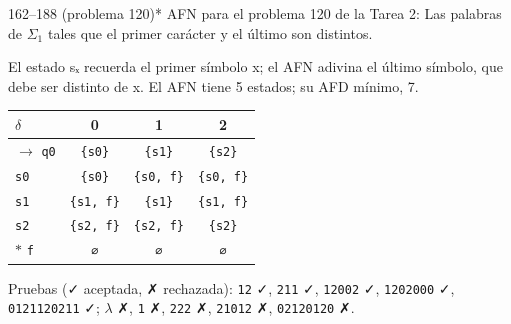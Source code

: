 \documentclass[11pt]{article}
\begin{document}
\begin{ejercicio}{162--188 (problema 120)}{*}
AFN para el problema 120 de la Tarea 2: Las palabras de $\Sigma_1$ tales que el primer carácter y el último son distintos.
\end{ejercicio}
\proc El estado sₓ recuerda el primer símbolo x; el AFN adivina el último símbolo, que debe ser distinto de x. El AFN tiene 5 estados; su AFD mínimo, 7.
\begin{center}\small\begin{tabular}{lccc}\toprule
$\delta$ & 0 & 1 & 2 \\\midrule
$\to$ \texttt{q0} & \texttt{\{s0\}} & \texttt{\{s1\}} & \texttt{\{s2\}} \\
 \texttt{s0} & \texttt{\{s0\}} & \texttt{\{s0, f\}} & \texttt{\{s0, f\}} \\
 \texttt{s1} & \texttt{\{s1, f\}} & \texttt{\{s1\}} & \texttt{\{s1, f\}} \\
 \texttt{s2} & \texttt{\{s2, f\}} & \texttt{\{s2, f\}} & \texttt{\{s2\}} \\
$*$ \texttt{f} & \texttt{∅} & \texttt{∅} & \texttt{∅} \\
\bottomrule\end{tabular}\end{center}
Pruebas (✓ aceptada, ✗ rechazada): \texttt{12} ✓, \texttt{211} ✓, \texttt{12002} ✓, \texttt{1202000} ✓, \texttt{0121120211} ✓; $\lambda$ ✗, \texttt{1} ✗, \texttt{222} ✗, \texttt{21012} ✗, \texttt{02120120} ✗.
\end{document}
